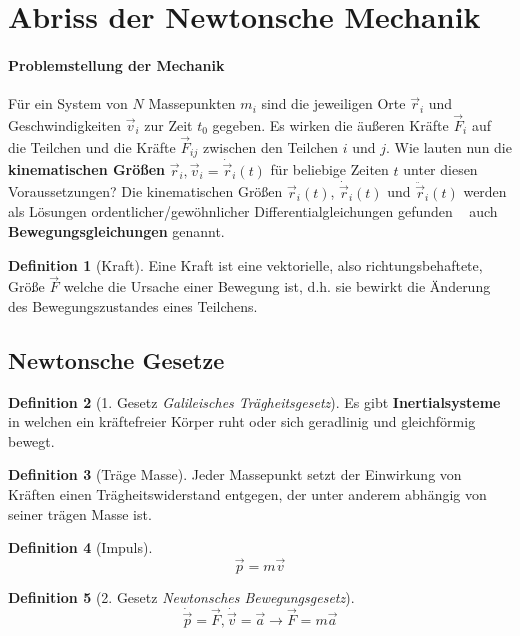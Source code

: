 \documentclass[oneside]{book}
\theoremstyle{definition}
\newtheorem*{definition*}{Definition}
\newcommand{\dotvec}[1]{\dot{\vec{#1}}}
\newcommand{\ddotvec}[1]{\ddot{\vec{#1}}}
\begin{document}
\section{Abriss der Newtonsche Mechanik}
\paragraph{Problemstellung der Mechanik}
Für ein System von $N$ Massepunkten $m_i$ sind die jeweiligen Orte $\vec{r}_i$ und Geschwindigkeiten $\vec{v}_i$ zur Zeit $t_0$ gegeben. Es wirken die äußeren Kräfte $\vec{F}_i$ auf die Teilchen und die Kräfte $\vec{F}_{ij}$ zwischen den Teilchen $i$ und $j$. Wie lauten nun die \textbf{kinematischen Größen} $\vec{r}_i, \vec{v}_i = \dotvec{r}_i(t)$  für beliebige Zeiten $t$ unter diesen Voraussetzungen? Die kinematischen Größen $\vec{r}_i(t)$, $\dotvec{r}_i(t)$ und $\ddotvec{r}_i(t)$ werden als Lösungen ordentlicher/gewöhnlicher Differentialgleichungen gefunden \textendash~ auch  \textbf{Bewegungsgleichungen} genannt.\\

\begin{definition*}[Kraft]
Eine Kraft ist eine vektorielle, also richtungsbehaftete, Größe $\vec{F}$ welche die Ursache einer Bewegung ist, d.h. sie bewirkt die Änderung des Bewegungszustandes eines Teilchens.
\end{definition*}

\subsection{Newtonsche Gesetze}
\begin{definition*}[1. Gesetz \textit{Galileisches Trägheitsgesetz}] 
Es gibt \textbf{Inertialsysteme} in welchen ein kräftefreier Körper ruht oder sich geradlinig und gleichförmig bewegt.
\end{definition*}

\begin{definition*}[Träge Masse]
	Jeder Massepunkt setzt der Einwirkung von Kräften einen Trägheitswiderstand entgegen, der unter anderem abhängig von seiner trägen Masse ist.
\end{definition*}

\begin{definition*}[Impuls]
	\begin{equation*}
		\vec{p} = m \vec{v}
	\end{equation*}
\end{definition*}

\begin{definition*}[2. Gesetz \textit{Newtonsches Bewegungsgesetz}]
\begin{equation*}
	\dot{\vec{p}} = \vec{F}, \dot{\vec{v}} = \vec{a} \rightarrow \vec{F} = m \vec{a}
\end{equation*}
\end{definition*}
\end{document}
